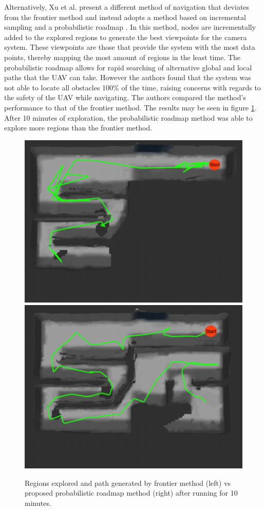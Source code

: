 \documentclass[english]{upeeei}
\begin{document}
Alternatively, Xu et al. present a 
different method of navigation that deviates from the frontier method and instead adopts a method based on incremental sampling
and a probabilistic roadmap \cite{ProbNav}. In this method, nodes are incrementally added to the explored regions to
generate the best viewpoints for the camera system. These viewpoints are those that provide the system with the most data
points, thereby mapping the most amount of regions in the least time. The probabilistic roadmap allows for rapid searching
of alternative global and local paths that the UAV can take. However the authors found that the system was not able to
locate all obstacles 100\% of the time, raising concerns with regards to the safety of the UAV while navigating. The authors
compared the method's performance to that of the frontier method. The results may be seen in figure \ref{fig:deptest}. After 10
minutes of exploration, the probabilistic roadmap method was able to explore more regions than the frontier method.
\begin{figure}[h]
    \centering
    \includegraphics[scale=0.5]{images/dep_frontier.PNG}
    \includegraphics[scale=0.5]{images/dep_dep.PNG}
    \caption{Regions explored and path generated by frontier method (left) vs proposed probabilistic roadmap method (right) after
    running for 10 minutes. \cite{ProbNav}}
    \label{fig:deptest}
\end{figure}
\end{document}
